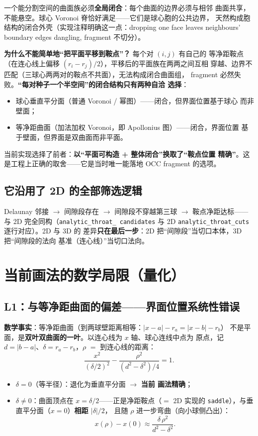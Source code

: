 \documentclass[11pt]{ctexart}
\begin{document}
一个能分割空间的曲面族必须\textbf{全局闭合}：每个曲面的边界必须与相邻
曲面共享，不能悬空。球心 Voronoi 脊恰好满足——它们是球心胞的公共边界，
天然构成胞结构的闭合外壳（实现注释明确这一点：dropping one face leaves
neighbours' boundary edges dangling, fragment 不切分）。

\textbf{为什么不能简单地``把平面平移到鞍点''？} 每个对 $(i,j)$ 有自己的
等净距鞍点（在连心线上偏移 $(r_i-r_j)/2$），平移后的平面族在两两之间互相
穿越、边界不匹配（三球心两两对的鞍点不共面），无法构成闭合曲面组，
fragment 必然失败。\textbf{``每对种子一个半空间''的闭合结构只有两种自洽
选择}：
\begin{itemize}
  \item 球心垂直平分面（普通 Voronoi / 幂图）——闭合，但界面位置基于球心
  而非壁面；
  \item 等净距曲面（加法加权 Voronoi，即 Apollonius 图）——闭合，界面位置
  基于壁面，但界面是双曲面而非平面。
\end{itemize}

当前实现选择了前者：\textbf{以``平面可构造 + 整体闭合''换取了``鞍点位置
精确''}。这是工程上正确的取舍——它是当时唯一能落地 OCC fragment 的选项。

\subsection{它沿用了 2D 的全部筛选逻辑}

Delaunay 邻接 $\rightarrow$ 间隙段存在 $\rightarrow$ 间隙段不穿越第三球
$\rightarrow$ 鞍点净距达标——与 2D 完全同构（\texttt{analytic\_throat\_
candidates} 与 2D \texttt{analytic\_throat\_cuts} 逐行对应）。2D 与 3D 的
差异\textbf{只在最后一步}：2D 把``间隙段''当切口本体，3D 把``间隙段的法向
基准（连心线）''当切口法向。

\section{当前画法的数学局限（量化）}

\subsection{L1：与等净距曲面的偏差——界面位置系统性错误}

\textbf{数学事实}：等净距曲面（到两球壁距离相等：$|x-a|-r_a = |x-b|-r_b$）
不是平面，是\textbf{双叶双曲面的一叶}。以连心线为 $x$ 轴、球心连线中点为
原点，记 $d = |b-a|$、$\delta = r_a - r_b$，$\rho$ $=$ 到连心线的距离：
\begin{equation}
\frac{x^2}{(\delta/2)^2} - \frac{\rho^2}{(d^2-\delta^2)/4} = 1.
\end{equation}
\begin{itemize}
  \item $\delta = 0$（等半径）：退化为垂直平分面 $\rightarrow$ \textbf{当前
  画法精确}；
  \item $\delta \neq 0$：曲面顶点在 $x = \delta/2$——正是净距鞍点（$=$ 2D
  实现的 \texttt{saddle}），与垂直平分面（$x=0$）\textbf{相距 $|\delta|/2$}，
  且随 $\rho$ 进一步弯曲（向小球侧凸出）：
  \begin{equation}
    x(\rho) - x(0) \approx \frac{\delta\,\rho^2}{d^2-\delta^2}.
  \end{equation}
\end{itemize}
\end{document}
